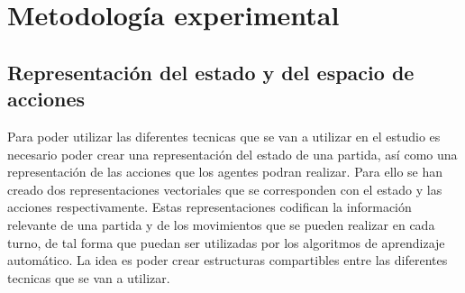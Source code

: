 \chapter{Metodología experimental}
 
\section{Representación del estado y del espacio de acciones}

Para poder utilizar las diferentes tecnicas que se van a utilizar en el estudio es necesario poder crear una representación del estado de una partida, así como una representación de las acciones que los agentes podran realizar. Para ello se han creado dos representaciones vectoriales que se corresponden con el estado y las acciones respectivamente. Estas representaciones codifican la información relevante de una partida y de los movimientos que se pueden realizar en cada turno, de tal forma que puedan ser utilizadas por los algoritmos de aprendizaje automático. La idea es poder crear estructuras compartibles entre las diferentes tecnicas que se van a utilizar.

